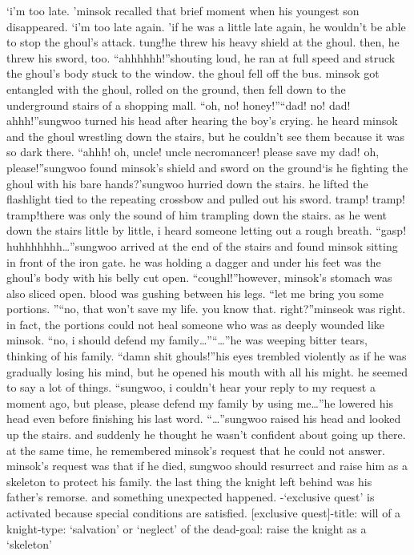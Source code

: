 ‘i’m too late.
’minsok recalled that brief moment when his youngest son disappeared.
‘i’m too late again.
’if he was a little late again, he wouldn’t be able to stop the ghoul’s attack.
tung!he threw his heavy shield at the ghoul.
then, he threw his sword, too.
“ahhhhhh!”shouting loud, he ran at full speed and struck the ghoul’s body stuck to the window.
 the ghoul fell off the bus.
minsok got entangled with the ghoul, rolled on the ground, then fell down to the underground stairs of a shopping mall.
“oh, no! honey!”“dad! no! dad! ahhh!”sungwoo turned his head after hearing the boy’s crying.
 he heard minsok and the ghoul wrestling down the stairs, but he couldn’t see them because it was so dark there.
“ahhh! oh, uncle! uncle necromancer! please save my dad! oh, please!”sungwoo found minsok’s shield and sword on the ground‘is he fighting the ghoul with his bare hands?’sungwoo hurried down the stairs.
 he lifted the flashlight tied to the repeating crossbow and pulled out his sword.
tramp! tramp! tramp!there was only the sound of him trampling down the stairs.
 as he went down the stairs little by little, i heard someone letting out a rough breath.
“gasp! huhhhhhhh…”sungwoo arrived at the end of the stairs and found minsok sitting in front of the iron gate.
he was holding a dagger and under his feet was the ghoul’s body with his belly cut open.
“coughl!”however, minsok’s stomach was also sliced open.
 blood was gushing between his legs.
“let me bring you some portions.
”“no, that won’t save my life.
 you know that.
 right?”minseok was right.
 in fact, the portions could not heal someone who was as deeply wounded like minsok.
“no, i should defend my family…”“…”he was weeping bitter tears, thinking of his family.
“damn shit ghouls!”his eyes trembled violently as if he was gradually losing his mind, but he opened his mouth with all his might.
 he seemed to say a lot of things.
“sungwoo, i couldn’t hear your reply to my request a moment ago, but please, please defend my family by using me…”he lowered his head even before finishing his last word.
“…”sungwoo raised his head and looked up the stairs.
 and suddenly he thought he wasn’t confident about going up there.
 at the same time, he remembered minsok’s request that he could not answer.
minsok’s request was that if he died, sungwoo should resurrect and raise him as a skeleton to protect his family.
 the last thing the knight left behind was his father’s remorse.
and something unexpected happened.
-‘exclusive quest’ is activated because special conditions are satisfied.
[exclusive quest]-title: will of a knight-type: ‘salvation’ or ‘neglect’ of the dead-goal: raise the knight as a ‘skeleton’

